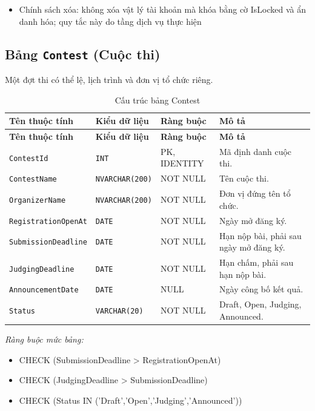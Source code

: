\begin{itemize}\raggedright
    \item Chính sách xóa: không xóa vật lý tài khoản mà khóa bằng cờ IsLocked và ẩn danh hóa; quy tắc này do tầng dịch vụ thực hiện
\end{itemize}

\subsection{Bảng \texttt{Contest} (Cuộc thi)}

Một đợt thi có thể lệ, lịch trình và đơn vị tổ chức riêng.

\begin{longtable}{|L{4cm}|L{3.15cm}|L{2.4cm}|L{4.55cm}|}
\caption{Cấu trúc bảng Contest} \\
\hline
\textbf{Tên thuộc tính} & \textbf{Kiểu dữ liệu} & \textbf{Ràng buộc} & \textbf{Mô tả} \\ \hline
\endfirsthead
\hline
\textbf{Tên thuộc tính} & \textbf{Kiểu dữ liệu} & \textbf{Ràng buộc} & \textbf{Mô tả} \\ \hline
\endhead
\texttt{ContestId} & \texttt{INT} & PK, IDENTITY & Mã định danh cuộc thi. \\ \hline
\texttt{ContestName} & \texttt{NVARCHAR(200)} & NOT NULL & Tên cuộc thi. \\ \hline
\texttt{OrganizerName} & \texttt{NVARCHAR(200)} & NOT NULL & Đơn vị đứng tên tổ chức. \\ \hline
\texttt{RegistrationOpenAt} & \texttt{DATE} & NOT NULL & Ngày mở đăng ký. \\ \hline
\texttt{SubmissionDeadline} & \texttt{DATE} & NOT NULL & Hạn nộp bài, phải sau ngày mở đăng ký. \\ \hline
\texttt{JudgingDeadline} & \texttt{DATE} & NOT NULL & Hạn chấm, phải sau hạn nộp bài. \\ \hline
\texttt{AnnouncementDate} & \texttt{DATE} & NULL & Ngày công bố kết quả. \\ \hline
\texttt{Status} & \texttt{VARCHAR(20)} & NOT NULL & Draft, Open, Judging, Announced. \\ \hline
\end{longtable}

\noindent\textit{Ràng buộc mức bảng:}

\begin{itemize}\raggedright
    \item CHECK (SubmissionDeadline > RegistrationOpenAt)
    \item CHECK (JudgingDeadline > SubmissionDeadline)
    \item CHECK (Status IN ('Draft',\allowbreak{}'Open',\allowbreak{}'Judging',\allowbreak{}'Announced'))
\end{itemize}

